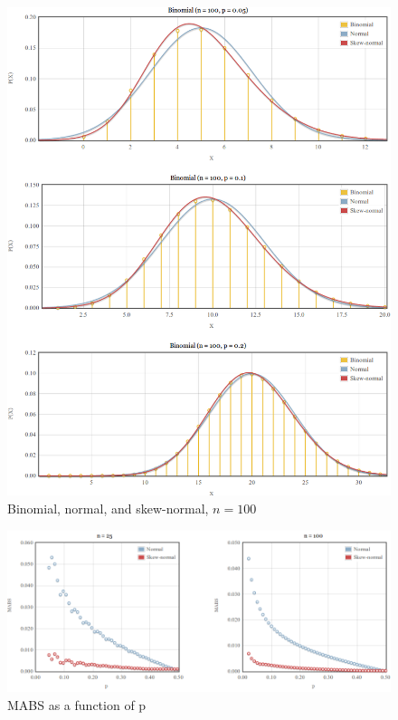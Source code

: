 \documentclass{article}
\begin{document}
\begin{figure}
  \centering
  \includegraphics[width=\textwidth]{../images/comparison-n100.png}
  \caption{Binomial, normal, and skew-normal, $n=100$}
  \label{fig:comparison-n100}
\end{figure}


\begin{figure}
  \centering
  \includegraphics[width=\textwidth]{../images/mabs-fixed-n.png}
  \caption{MABS as a function of p}
  \label{fig:mabs-fixed-n}
\end{figure}
\end{document}
